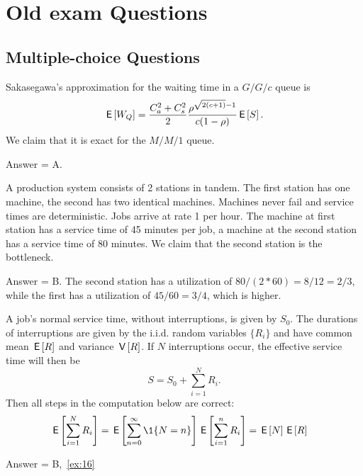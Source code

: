 \section{Old exam Questions}

\subsection{Multiple-choice Questions}

\begin{exercise}[201807]
Sakasegawa's approximation for the waiting time in a $G/G/c$ queue is 
\begin{equation*}
  \,\mathsf{E}\left[W_Q\right] = \frac{C_a^2+C_s^2}2 \frac{\rho^{\sqrt{2(c+1)}-1}}{c(1-\rho)} \,\mathsf{E}\left[S\right].
\end{equation*}
We claim that it is exact for the $M/M/1$ queue.
\begin{solution}
Answer = A.
\end{solution}
\end{exercise}

\begin{exercise}[201807]
  A production system consists of 2 stations in tandem. The first station has one machine, the second has two identical machines. Machines never fail and service times are deterministic. Jobs arrive at rate 1 per hour. The machine at first station has a service time of 45 minutes per job, a machine at the second station has a service time of 80 minutes. We claim that the second  station is the bottleneck. 
\begin{solution}
Answer = B. The second station has a utilization of $80/(2*60) = 8/12 = 2/3$, while  the first has a utilization of $45/60 = 3/4$, which is higher.
\end{solution}
\end{exercise}


\begin{exercise}[201904]
  A job's normal service time, without interruptions, is given by $S_0$.
  The durations of interruptions are given by the i.i.d.
  random variables $\{R_i\}$ and have common mean $\,\mathsf{E}\left[R\right]$ and variance $\,\mathsf{V}\left[R\right]$.
  If $N$ interruptions occur, the effective service time will then be
\begin{equation*}
S= S_0 + \sum_{i=1}^N R_i.
\end{equation*}
Then all steps in the computation below are correct: 
\begin{align*}
  \E{\sum_{i=1}^N R_i} 
&=  \E{ \sum_{n=0}^\infty \1{N=n}} \E{ \sum_{i=1}^n R_i } = \E N \E R
\end{align*}
\begin{solution} Answer = B,~\cref{ex:16}
\end{solution}
\end{exercise}


